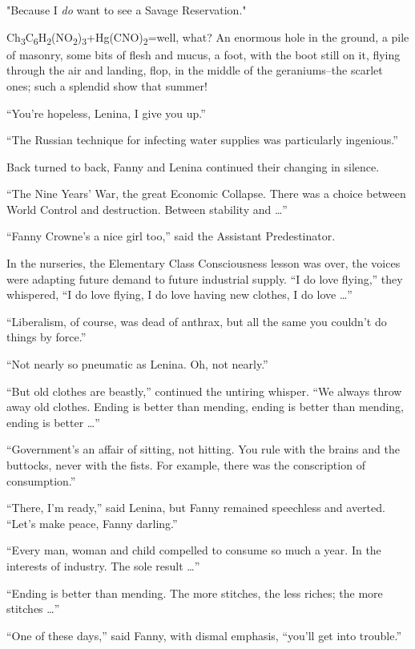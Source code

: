 \documentclass[12pt]{report}
\begin{document}
"Because I \emph{do} want to see a Savage Reservation."

Ch\textsubscript{3}C\textsubscript{6}H\textsubscript{2}(NO\textsubscript{2})\textsubscript{3}+Hg(CNO)\textsubscript{2}=well,
what? An enormous hole in the ground, a pile of masonry, some bits of
flesh and mucus, a foot, with the boot still on it, flying through the
air and landing, flop, in the middle of the geraniums--the scarlet ones;
such a splendid show that summer!

``You're hopeless, Lenina, I give you up.''

``The Russian technique for infecting water supplies was particularly
ingenious.''

Back turned to back, Fanny and Lenina continued their changing in
silence.

``The Nine Years' War, the great Economic Collapse. There was a choice
between World Control and destruction. Between stability and \ldots{}''

``Fanny Crowne's a nice girl too,'' said the Assistant Predestinator.

In the nurseries, the Elementary Class Consciousness lesson was over,
the voices were adapting future demand to future industrial supply. ``I
do love flying,'' they whispered, ``I do love flying, I do love having
new clothes, I do love \ldots{}''

``Liberalism, of course, was dead of anthrax, but all the same you
couldn't do things by force.''

``Not nearly so pneumatic as Lenina. Oh, not nearly.''

``But old clothes are beastly,'' continued the untiring whisper. ``We
always throw away old clothes. Ending is better than mending, ending is
better than mending, ending is better \ldots{}''

``Government's an affair of sitting, not hitting. You rule with the
brains and the buttocks, never with the fists. For example, there was
the conscription of consumption.''

``There, I'm ready,'' said Lenina, but Fanny remained speechless and
averted. ``Let's make peace, Fanny darling.''

``Every man, woman and child compelled to consume so much a year. In the
interests of industry. The sole result \ldots{}''

``Ending is better than mending. The more stitches, the less riches; the
more stitches \ldots{}''

``One of these days,'' said Fanny, with dismal emphasis, ``you'll get
into trouble.''
\end{document}
